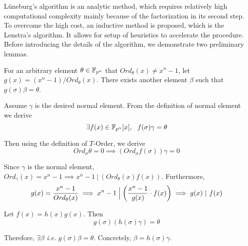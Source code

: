 L\"uneburg's algorithm is an analytic method, which requires relatively high computational complexity 
mainly because of the factorization in its second step. To overcome the high cost, an inductive method 
is proposed, which is the Lenstra's algorithm. It allows for setup of heuristics to accelerate the procedure.
Before introducing the details of the algorithm, we demonstrate two preliminary lemmas.
\begin{Lemma}
\label{lem:4}
For an arbitrary element $\theta \in {\mathbb{F}}_{p^n}$ that $Ord_\theta(x) \neq x^n - 1$,
let $g(x) = (x^n - 1)/Ord_\theta(x)$. There exists another element $\beta$ such that $g(\sigma)\beta = \theta$.
\end{Lemma}
\begin{Proof}
Assume $\gamma$ is the desired normal element. From the definition of normal element we derive 
$$\exists f(x)\in {\mathbb{F}}_{p^n}[x],~~f(\sigma)\gamma = \theta$$

Then using the definition of $T$-Order, we derive
$$Ord_{\sigma}\theta = 0 \implies (Ord_{\sigma}f(\sigma))\gamma = 0$$

Since $\gamma$ is the normal element, $Ord_\gamma(x) = x^n-1\implies x^n-1~|~(Ord_\theta(x)f(x))$.
Furthermore,
$$g(x) = \frac{x^n-1}{Ord_\theta(x)} \implies x^n-1\Bigm|\left(\frac{x^n-1}{g(x)}\cdot f(x)\right)\implies g(x)~|~f(x)$$

Let $f(x)=h(x)g(x)$. Then
$$g(\sigma)(h(\sigma)\gamma) = \theta$$

Therefore, $\exists \beta$ {\it i.e. }$g(\sigma)\beta = \theta$. Concretely, $\beta = h(\sigma)\gamma$.
\end{Proof}

